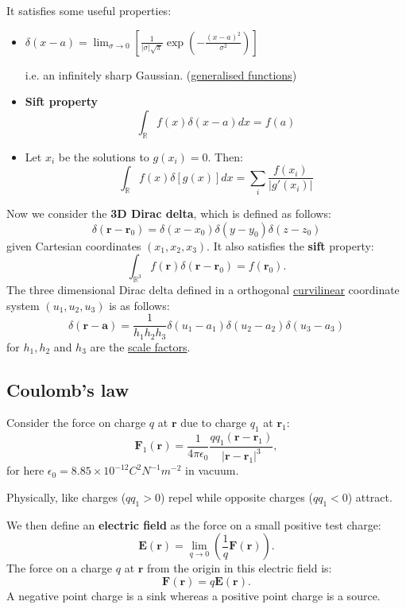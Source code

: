 \documentclass{article}
\begin{document}
It satisfies some useful properties:
\begin{itemize}
    \item $\delta(x-a) =
    \displaystyle\lim_{\sigma\rightarrow0}\left[\frac{1}{|\sigma|\sqrt{\pi}}
    \exp\left(-\frac{(x-a)^2}{\sigma^2}\right)\right]$

    i.e. an infinitely sharp Gaussian. (\underline{generalised functions})

    \item \textbf{Sift property}
    $$\int_{\mathbb{R}}f(x)\delta(x-a)dx=f(a)$$

    \item Let $x_i$ be the solutions to $g(x_i)=0$. Then:
    $$\int_{\mathbb{R}}f(x)\delta[g(x)]dx
    =\sum_i\frac{f(x_i)}{|g'(x_i)|}$$
\end{itemize}

Now we consider the \textbf{3D Dirac delta}, which is defined as follows:
$$\delta(\boldsymbol{r}-\boldsymbol{r}_0)=\delta(x-x_0)\delta(y-y_0)\delta(z-z_0)$$
given Cartesian coordinates $(x_1, x_2, x_3)$. It also satisfies the \textbf{sift} property:
$$\int_{\mathbb{R}^3}f(\boldsymbol{r})\delta(\boldsymbol{r}-\boldsymbol{r}_0)
=f(\boldsymbol{r}_0).$$
The three dimensional Dirac delta defined in a orthogonal \underline{curvilinear} coordinate system $(u_1, u_2, u_3)$ is as follows:
$$\delta(\boldsymbol{r}-\boldsymbol{a})=\frac{1}{h_1 h_2 h_3}
\delta(u_1-a_1)\delta(u_2-a_2)\delta(u_3-a_3)$$
for $h_1, h_2$ and $h_3$ are the \underline{scale factors}.

\newpage

\subsection{Coulomb's law}
Consider the force on charge $q$ at $\boldsymbol{r}$ due to charge $q_1$
at $\boldsymbol{r}_1$:
$$\boldsymbol{F}_1(\boldsymbol{r})=\frac{1}{4\pi\epsilon_0}
\frac{qq_1(\boldsymbol{r}-\boldsymbol{r}_1)}{|\boldsymbol{r}-\boldsymbol{r}_1|^3},$$
for here $\epsilon_0=8.85\times10^{-12}C^2N^{-1}m^{-2}$ in vacuum. 

Physically, like charges ($qq_1>0$) repel while opposite charges ($qq_1<0$) attract.

We then define an \textbf{electric field} as the force on a small positive test charge:
$$\boldsymbol{E}(\boldsymbol{r})=
\lim_{q\rightarrow 0}\left(\frac{1}{q}\boldsymbol{F}(\boldsymbol{r})\right).$$
The force on a charge $q$ at $\boldsymbol{r}$ from the origin in this electric field is:
$$\boldsymbol{F}(\boldsymbol{r})=q\boldsymbol{E}(\boldsymbol{r}).$$
A negative point charge is a sink whereas a positive point charge is a source.
\end{document}
